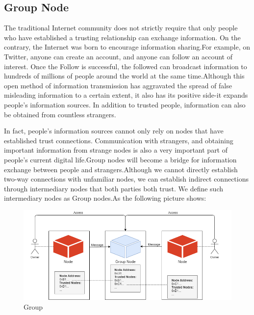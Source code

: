\documentclass{article}
\begin{document}
\subsection{Group Node}\label{group_node}
    The traditional Internet community does not strictly require that only people who have established a trusting relationship can exchange information. On the contrary, the Internet was born to encourage information sharing.For example, on Twitter, anyone can create an account, and anyone can follow an account of interest. Once the Follow is successful, the followed can broadcast information to hundreds of millions of people around the world at the same time.Although this open method of information transmission has aggravated the spread of false misleading information to a certain extent, it also has its positive side-it expands people's information sources. In addition to trusted people, information can also be obtained from countless strangers.

    In fact, people's information sources cannot only rely on nodes that have established trust connections. Communication with strangers, and obtaining important information from strange nodes is also a very important part of people's current digital life.Group nodes will become a bridge for information exchange between people and strangers.Although we cannot directly establish two-way connections with unfamiliar nodes, we can establish indirect connections through intermediary nodes that both parties both trust. We define such intermediary nodes as Group nodes.As the following picture shows:

    \begin{figure}[H]
        \centering
        \includegraphics[width=\textwidth]{figures-group.png}
        \caption{Group}
    \end{figure}
    
\end{document}
